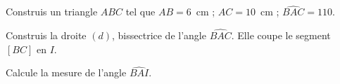 \begin{myenumerate}
\item Construis un triangle $ABC$ tel que
$AB=6$~cm ; $AC=10$~cm ; $\widehat{BAC}=110$\degres.
\item Construis la droite $(d)$, bissectrice de l'angle
$\widehat{BAC}$. Elle coupe le segment $[BC]$ en $I$.\par Calcule la
mesure de l'angle $\widehat{BAI}$.
\end{myenumerate}
